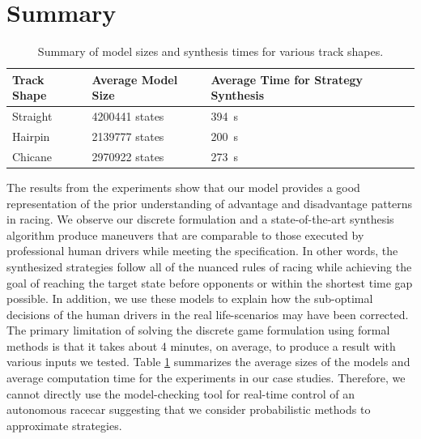 \FloatBarrier
\section{Summary}
\begin{table}
\centering
\begin{tabular}{|l|l|p{4.5cm}|}
\hline
\textbf{Track Shape} & \textbf{Average Model Size} & \textbf{Average Time for Strategy Synthesis} 
\\ \hline
Straight   & 4200441 states      & \SI{394}{s}       \\ \hline
Hairpin   & 2139777  states     & \SI{200}{s}       \\ \hline
Chicane   & 2970922 states & \SI{273}{s}      \\ \hline
\end{tabular}%
\caption{Summary of model sizes and synthesis times for various track shapes.}
\label{table:discrete_exp_summary}
\end{table}
The results from the experiments show that our model provides a good representation of the prior understanding of advantage and disadvantage patterns in racing. We observe our discrete formulation and a state-of-the-art synthesis algorithm produce maneuvers that are comparable to those executed by professional human drivers while meeting the specification. In other words, the synthesized strategies follow all of the nuanced rules of racing while achieving the goal of reaching the target state before opponents or within the shortest time gap possible. In addition, we use these models to explain how the sub-optimal decisions of the human drivers in the real life-scenarios may have been corrected. The primary limitation of solving the discrete game formulation using formal methods is that it takes about 4 minutes, on average, to produce a result with various inputs we tested. Table \ref{table:discrete_exp_summary} summarizes the average sizes of the models and average computation time for the experiments in our case studies. Therefore, we cannot directly use the model-checking tool for real-time control of an autonomous racecar suggesting that we consider probabilistic methods to approximate strategies.